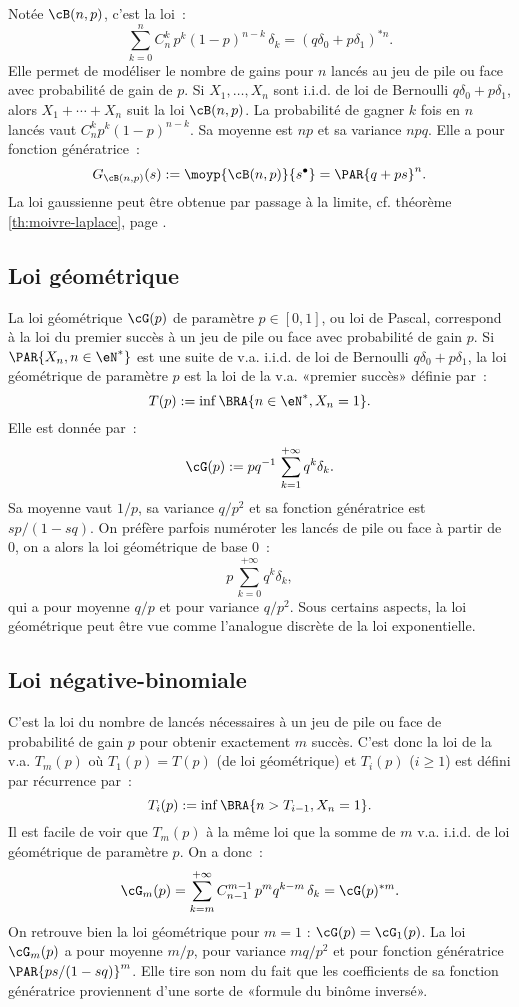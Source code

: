Notée $\cB(n,p)$, c'est la loi~:
$$
\sum_{k=0}^n C_n^k\,p^k(1-p)^{n-k}\,\delta_k=(q\delta_0+p\delta_1)^{*n}.
$$
Elle permet de modéliser le nombre de gains pour $n$ lancés au jeu de pile
ou face avec probabilité de gain de $p$. Si $X_1,\ldots,X_n$ sont i.i.d. de loi de
Bernoulli $q\delta_0+p\delta_1$, alors $X_1+\cdots+X_n$ suit la loi $\cB(n,p)$. La
probabilité de gagner $k$ fois en $n$ lancés vaut $C_n^k p^k(1-p)^{n-k}$. Sa
moyenne est $np$ et sa variance $npq$. Elle a pour fonction génératrice~:
$$
G_{\cB(n,p)}(s):=\moyp{\cB(n,p)}{s^\bullet}=\PAR{q+ps}^n.
$$
La loi gaussienne peut être obtenue par passage à la limite, cf. théorème
\ref{th:moivre-laplace}, page \pageref{th:moivre-laplace}.

%
\subsection{Loi géométrique}\label{ss:loi:geometrique}
%

La loi géométrique $\cG(p)$ de paramètre $p\in[0,1]$, ou loi de Pascal,
correspond à la loi du premier succès à un jeu de pile ou face avec
probabilité de gain $p$. Si $\PAR{X_n,n\in\eN^*}$ est une suite de v.a. i.i.d.
de loi de Bernoulli $q\delta_0+p\delta_1$, la loi géométrique de paramètre $p$ est
la loi de la v.a. «premier succès» définie par~:
$$
T(p):=\inf\BRA{n\in\eN^*, X_n=1}.
$$
Elle est donnée par~:
$$
\cG(p):=pq^{-1}\,\sum_{k=1}^{+\infty} q^k\delta_k.
$$
Sa moyenne vaut $1/p$, sa variance $q/p^2$ et sa fonction génératrice est
$sp/(1-sq)$. On préfère parfois numéroter les lancés de pile ou face à partir
de $0$, on a alors la loi géométrique de base $0$~:
$$
p\,\sum_{k=0}^{+\infty} q^k\delta_k,
$$
qui a pour moyenne $q/p$ et pour variance $q/p^2$.
Sous certains aspects, la loi géométrique peut être vue
comme l'analogue discrète de la loi exponentielle. 

%
\subsection{Loi négative-binomiale}\label{ss:loi:negative-binomiale}
%

C'est la loi du nombre de lancés nécessaires à un jeu de pile ou face de
probabilité de gain $p$ pour obtenir exactement $m$ succès.  C'est donc la loi
de la v.a. $T_m(p)$ où $T_1(p)=T(p)$ (de loi géométrique) et $T_i(p)$ ($i\geq 1$) est
défini par récurrence par~:
$$
T_i(p):=\inf\BRA{n>T_{i-1}, X_n=1}.
$$
Il est facile de voir que $T_m(p)$ à la même loi que la somme de $m$ v.a.
i.i.d. de loi géométrique de paramètre $p$. On a donc~:
$$
\cG_m(p)= \sum_{k=m}^{+\infty} C_{n-1}^{m-1}\,p^m q^{k-m} \,\delta_k
= \cG(p)^{*m}.
$$
On retrouve bien la loi géométrique pour $m=1$ : $\cG(p)=\cG_1(p)$. La loi
$\cG_m(p)$ a pour moyenne $m/p$, pour variance $mq/p^2$ et pour fonction
génératrice $\PAR{ps/(1-sq)}^m$. Elle tire son nom du fait que les
coefficients de sa fonction génératrice proviennent d'une sorte de «formule du
binôme inversé».

